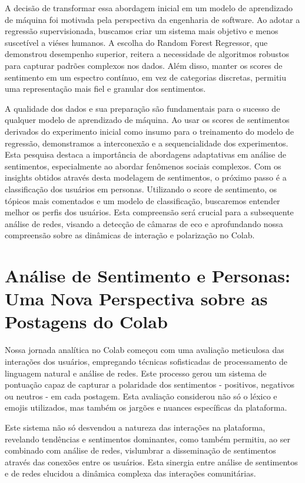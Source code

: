 A decisão de transformar essa abordagem inicial em um modelo de aprendizado de máquina foi motivada pela perspectiva da engenharia de software. Ao adotar a regressão supervisionada, buscamos criar um sistema mais objetivo e menos suscetível a viéses humanos. A escolha do Random Forest Regressor, que demonstrou desempenho superior, reitera a necessidade de algoritmos robustos para capturar padrões complexos nos dados. Além disso, manter os scores de sentimento em um espectro contínuo, em vez de categorias discretas, permitiu uma representação mais fiel e granular dos sentimentos.

A qualidade dos dados e sua preparação são fundamentais para o sucesso de qualquer modelo de aprendizado de máquina. Ao usar os scores de sentimentos derivados do experimento inicial como insumo para o treinamento do modelo de regressão, demonstramos a interconexão e a sequencialidade dos experimentos. Esta pesquisa destaca a importância de abordagens adaptativas em análise de sentimentos, especialmente ao abordar fenômenos sociais complexos. Com os insights obtidos através desta modelagem de sentimentos, o próximo passo é a classificação dos usuários em personas. Utilizando o score de sentimento, os tópicos mais comentados e um modelo de classificação, buscaremos entender melhor os perfis dos usuários. Esta compreensão será crucial para a subsequente análise de redes, visando a detecção de câmaras de eco e aprofundando nossa compreensão sobre as dinâmicas de interação e polarização no Colab.

\section{Análise de Sentimento e Personas: Uma Nova Perspectiva sobre as Postagens do Colab}

Nossa jornada analítica no Colab começou com uma avaliação meticulosa das interações dos usuários, empregando técnicas sofisticadas de processamento de linguagem natural e análise de redes. Este processo gerou um sistema de pontuação capaz de capturar a polaridade dos sentimentos - positivos, negativos ou neutros - em cada postagem. Esta avaliação considerou não só o léxico e emojis utilizados, mas também os jargões e nuances específicas da plataforma.

Este sistema não só desvendou a natureza das interações na plataforma, revelando tendências e sentimentos dominantes, como também permitiu, ao ser combinado com análise de redes, vislumbrar a disseminação de sentimentos através das conexões entre os usuários. Esta sinergia entre análise de sentimentos e de redes elucidou a dinâmica complexa das interações comunitárias.

